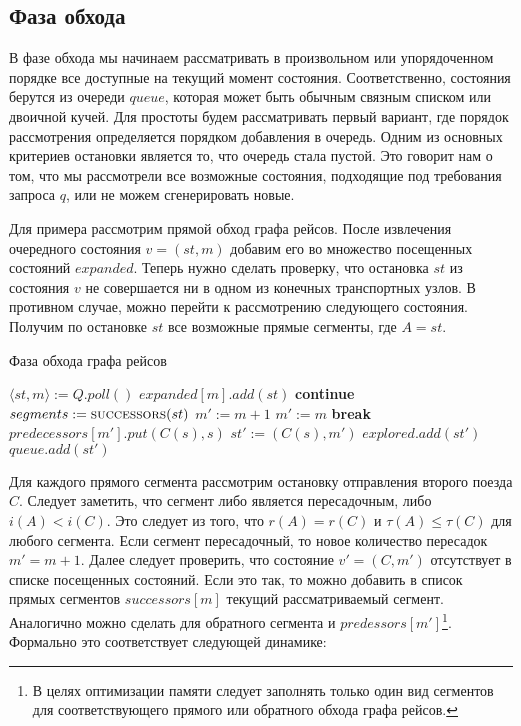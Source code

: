 \FloatBarrier
\subsection{Фаза обхода}
В фазе обхода мы начинаем рассматривать в произвольном или упорядоченном порядке все доступные на текущий момент состояния. Соответственно, состояния берутся из очереди $queue$, которая может быть обычным связным списком или двоичной кучей. Для простоты будем рассматривать первый вариант, где порядок рассмотрения определяется порядком добавления в очередь. Одним из основных критериев остановки является то, что очередь стала пустой. Это говорит нам о том, что мы рассмотрели все возможные состояния, подходящие под требования запроса $q$, или не можем сгенерировать новые.

Для примера рассмотрим прямой обход графа рейсов. После извлечения очередного состояния $v=(st, m)$ добавим его во множество посещенных состояний $expanded$. Теперь нужно сделать проверку, что остановка $st$ из состояния $v$ не совершается ни в одном из конечных транспортных узлов. В противном случае, можно перейти к рассмотрению следующего состояния. Получим по остановке $st$ все возможные прямые сегменты, где $A = st$. 

\begin{algorithm}[!h]
	\caption{Фаза обхода графа рейсов}\label{lst5}
	\begin{algorithmic}
			\State $\langle st, m \rangle := Q.poll()$
			\State $expanded[m].add(st)$
				\State \textbf{continue}
			\EndIf
			\State $segments := \Call{successors}{st}$
					\State $m' := m + 1$
				\Else
					\State $m' := m$
				\EndIf
					\State \textbf{break}
				\EndIf
				\State $predecessors[m'].put(C(s), s)$
				\State $st' := (C(s), m')$
					\State $explored.add(st')$
					\State $queue.add(st')$
				\EndIf
			\EndFor
		\EndWhile
		\EndFunction
	\end{algorithmic}
\end{algorithm}

Для каждого прямого сегмента рассмотрим остановку отправления второго поезда $C$. Следует заметить, что сегмент либо является пересадочным, либо $i(A) < i(C)$. Это следует из того, что $r(A)=r(C)$ и $\tau(A) \leqslant \tau(C)$ для любого сегмента. Если сегмент пересадочный, то новое количество пересадок $m' = m + 1$. Далее следует проверить, что состояние $v'=(C, m')$ отсутствует в списке посещенных состояний. Если это так, то можно добавить в список прямых сегментов $successors[m]$ текущий рассматриваемый сегмент. Аналогично можно сделать для обратного сегмента и $predessors[m']$\footnote{В целях оптимизации памяти следует заполнять только один вид сегментов для соответствующего прямого или обратного обхода графа рейсов.}. Формально это соответствует следующей динамике:

